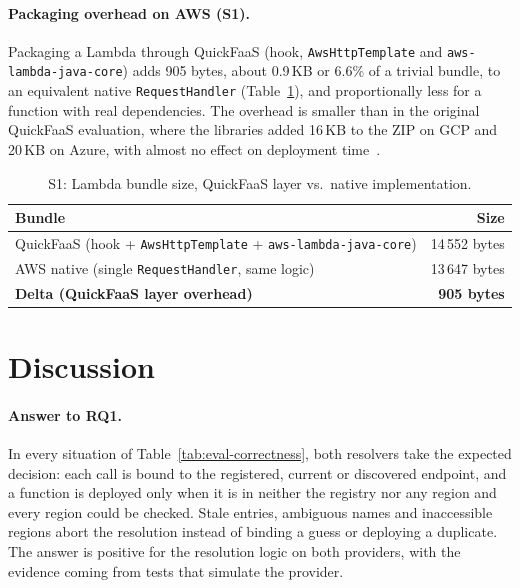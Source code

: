 \paragraph{Packaging overhead on AWS (S1).}
Packaging a Lambda through QuickFaaS (hook, \texttt{AwsHttpTemplate} and
\texttt{aws-lambda-java-core}) adds 905 bytes, about 0.9\,KB or 6.6\% of a trivial bundle, to an
equivalent native \texttt{RequestHandler} (Table~\ref{tab:eval-s1}), and proportionally less for a
function with real dependencies. The overhead is smaller than in the original QuickFaaS evaluation,
where the libraries added 16\,KB to the ZIP on GCP and 20\,KB on Azure, with almost no effect on
deployment time~\cite{rodrigues2022quickfaas}.

\begin{table}[!htbp]
  \centering
  \captionsetup{belowskip=0pt}
  \small
  \caption{S1: Lambda bundle size, QuickFaaS layer vs.\ native implementation.}
  \label{tab:eval-s1}
  \begin{tabular}{|>{\raggedright\arraybackslash}p{}|r|}
    \hline
    \textbf{Bundle} & \textbf{Size} \\
    \hline
    QuickFaaS (hook + \texttt{AwsHttpTemplate} + \texttt{aws-lambda-java-core}) & 14\,552 bytes \\
    \hline
    AWS native (single \texttt{RequestHandler}, same logic) & 13\,647 bytes \\
    \hline
    \textbf{Delta (QuickFaaS layer overhead)} & \textbf{905 bytes} \\
    \hline
  \end{tabular}
\end{table}

\section{Discussion}
\label{sec:eval-discussion}

\paragraph{Answer to RQ1.}
In every situation of Table~\ref{tab:eval-correctness}, both resolvers take the expected decision:
each call is bound to the registered, current or discovered endpoint, and a function is deployed
only when it is in neither the registry nor any region and every region could be checked. Stale
entries, ambiguous names and inaccessible regions abort the resolution instead of binding a guess
or deploying a duplicate. The answer is positive for the resolution logic on both providers, with
the evidence coming from tests that simulate the provider.

